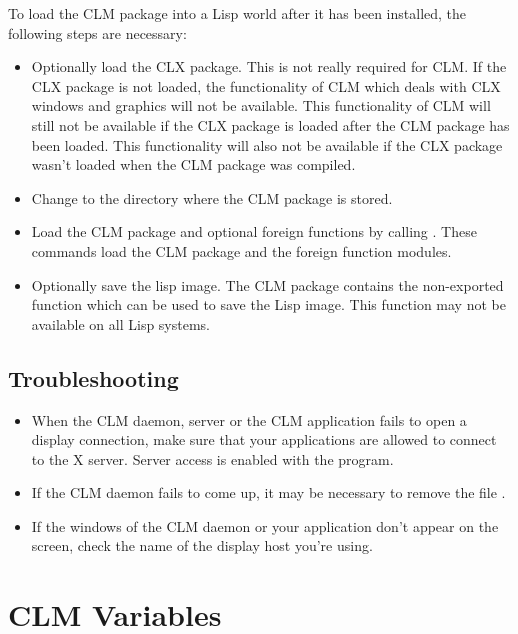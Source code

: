 To load the CLM package into a Lisp world after it has been installed,
the following steps are necessary:
\begin{itemize}

\item Optionally load the CLX package.  This is not really required for CLM.  If
the CLX package is not loaded, the functionality of CLM which deals with CLX
windows and graphics will not be available.  This functionality of CLM will
still not be available if the CLX package is loaded after the CLM package has
been loaded.  This functionality will also not be available if the CLX package
wasn't loaded when the CLM package was compiled. 

\item Change to the directory where the CLM package is stored.

\item Load the CLM package and optional foreign functions by calling
.  These commands load the
CLM package and the foreign function modules. 

\item Optionally save the lisp image.  The CLM package contains the non-exported
function  which can be used to save
the Lisp image.  This function may not be available on all Lisp systems. 

\end{itemize}

\section{Troubleshooting}

\begin{itemize}
\item When the CLM daemon, server or the CLM application fails to open a
display connection, make sure that your applications are allowed to connect to
the X server.  Server access is enabled with the  program.
\item If the CLM daemon fails to come up, it may be necessary to remove the
file . 
\item If the windows of the CLM daemon or your application don't appear on
the screen, check the name of the display host you're using.
\end{itemize}

\chapter{CLM Variables}

